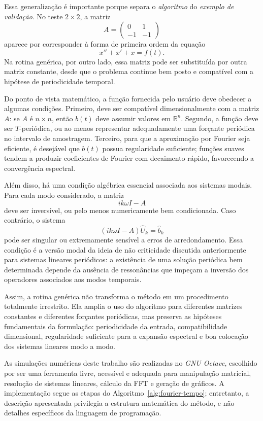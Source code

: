 Essa generalização é importante porque separa o \emph{algoritmo} do \emph{exemplo de validação}. No teste \(2\times2\), a matriz
\[
A=\begin{pmatrix}0&1\\-1&-1\end{pmatrix}
\]
aparece por corresponder à forma de primeira ordem da equação
\[
x''+x'+x=f(t).
\]
Na rotina genérica, por outro lado, essa matriz pode ser substituída por outra matriz constante, desde que o problema continue bem posto e compatível com a hipótese de periodicidade temporal.

Do ponto de vista matemático, a função fornecida pelo usuário deve obedecer a algumas condições. Primeiro, deve ser compatível dimensionalmente com a matriz \(A\): se \(A\) é \(n\times n\), então \(b(t)\) deve assumir valores em \(\mathbb{R}^n\). Segundo, a função deve ser \(T\)-periódica, ou ao menos representar adequadamente uma forçante periódica no intervalo de amostragem. Terceiro, para que a aproximação por Fourier seja eficiente, é desejável que \(b(t)\) possua regularidade suficiente; funções suaves tendem a produzir coeficientes de Fourier com decaimento rápido, favorecendo a convergência espectral.

Além disso, há uma condição algébrica essencial associada aos sistemas modais. Para cada modo considerado, a matriz
\[
ik\omega I-A
\]
deve ser inversível, ou pelo menos numericamente bem condicionada. Caso contrário, o sistema
\[
(ik\omega I-A)\widehat{U}_k=\widehat{b}_k
\]
pode ser singular ou extremamente sensível a erros de arredondamento. Essa condição é a versão modal da ideia de não criticidade discutida anteriormente para sistemas lineares periódicos: a existência de uma solução periódica bem determinada depende da ausência de ressonâncias que impeçam a inversão dos operadores associados aos modos temporais.

Assim, a rotina genérica não transforma o método em um procedimento totalmente irrestrito. Ela amplia o uso do algoritmo para diferentes matrizes constantes e diferentes forçantes periódicas, mas preserva as hipóteses fundamentais da formulação: periodicidade da entrada, compatibilidade dimensional, regularidade suficiente para a expansão espectral e boa colocação dos sistemas lineares modo a modo.

As simulações numéricas deste trabalho são realizadas no \emph{GNU Octave}, escolhido por ser uma ferramenta livre, acessível e adequada para manipulação matricial, resolução de sistemas lineares, cálculo da FFT e geração de gráficos. A implementação segue as etapas do Algoritmo~\ref{alg:fourier-tempo}; entretanto, a descrição apresentada privilegia a estrutura matemática do método, e não detalhes específicos da linguagem de programação.

